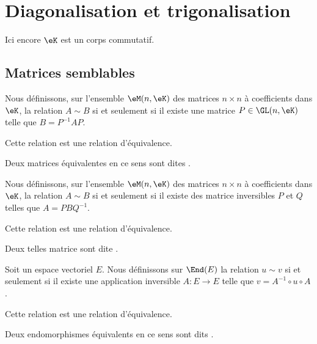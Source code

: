 

\section{Diagonalisation et trigonalisation}

Ici encore \( \eK\) est un corps commutatif.

\subsection{Matrices semblables}

\begin{propositionDef} \label{DefCQNFooSDhDpB}
	Nous définissons, sur l'ensemble \( \eM(n,\eK)\) des matrices \( n\times n\) à coefficients dans \(\eK\), la relation  \( A\sim B\) si et seulement si il existe une matrice \( P\in\GL(n,\eK)\) telle que \( B=P^{-1}AP\).

	Cette relation est une relation d'équivalence.

	Deux matrices équivalentes en ce sens sont dites .
\end{propositionDef}

\begin{propositionDef}      \label{PROPooXGXTooQNAAxw}
    Nous définissons, sur l'ensemble \( \eM(n,\eK)\) des matrices \( n\times n\) à coefficients dans \(\eK\), la relation  \( A\sim B\) si et seulement si il existe des matrice inversibles \( P\) et \( Q\) telles que \( A=PBQ^{-1}\).

	Cette relation est une relation d'équivalence.

    Deux telles matrice sont dite .
\end{propositionDef}

\begin{propositionDef}      \label{PROPooIXFSooZsFWHm}
	Soit un espace vectoriel \( E\). Nous définissons sur \( \End(E)\) la relation \( u\sim v\) si et seulement si il existe une application inversible \( A\colon E\to E\) telle que \( v=A^{-1}\circ u\circ A\).

	Cette relation est une relation d'équivalence.

	Deux endomorphismes équivalents en ce sens sont dits .
\end{propositionDef}

